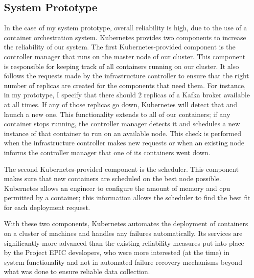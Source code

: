 \subsection{System Prototype}

In the case of my system prototype, overall reliability is high, due to the use of a container orchestration system. Kubernetes provides two components to increase the reliability of our system. The first Kubernetes-provided component is the controller manager that runs on the master node of our cluster. This component is responsible for keeping track of all containers running on our cluster. It also follows the requests made by the infrastructure controller to ensure that the right number of replicas are created for the components that need them. For instance, in my prototype, I specify that there should 2 replicas of a Kafka broker available at all times. If any of those replicas go down, Kubernetes will detect that and launch a new one. This functionality extends to all of our containers; if any container stops running, the controller manager detects it and schedules a new instance of that container to run on an available node. This check is performed when the infrastructure controller makes new requests or when an existing node informs the controller manager that one of its containers went down.

The second Kubernetes-provided component is the scheduler. This component makes sure that new containers are scheduled on the best node possible. Kubernetes allows an engineer to configure the amount of memory and cpu permitted by a container; this information allows the scheduler to find the best fit for each deployment request.

With these two components, Kubernetes automates the deployment of containers on a cluster of machines and handles any failures automatically. Its services are significantly more advanced than the existing reliability measures put into place by the Project EPIC developers, who were more interested (at the time) in system functionality and not in automated failure recovery mechanisms beyond what was done to ensure reliable data collection.

